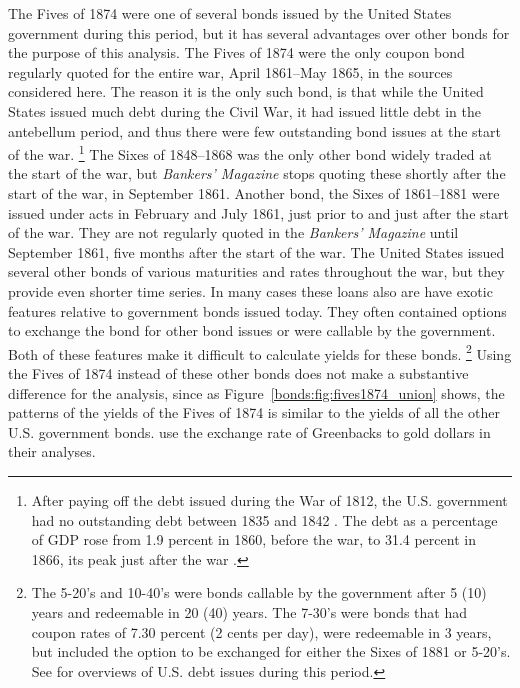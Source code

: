 The Fives of 1874 were one of several bonds issued by the United States government during this period, but it has several advantages over other bonds for the purpose of this analysis.
The Fives of 1874 were the only coupon bond regularly quoted for the entire war, April 1861--May 1865, in the sources considered here.
The reason it is the only such bond, is that while the United States issued much debt during the Civil War, it had issued little debt in the antebellum period, and thus there were few outstanding bond issues at the start of the war.%
\footnote{
  After paying off the debt issued during the War of 1812, the U.S. government had no outstanding debt between 1835 and 1842 \parencite[297]{HomerSylla2005}.
  The debt as a percentage of GDP rose from 1.9 percent in 1860, before the war, to 31.4 percent in 1866, its peak just after the war \parencites{CBO2012}{CBO2012a}.
}
The Sixes of 1848--1868 was the only other bond widely traded at the start of the war, but \textit{Bankers' Magazine} stops quoting these shortly after the start of the war,  in September 1861.
Another bond, the  Sixes of 1861--1881 were issued under acts in February and July 1861, just prior to and just after the start of the war.
They are not regularly quoted in the \textit{Bankers' Magazine} until September 1861, five months after the start of the war.
The United States issued several other bonds of various maturities and rates throughout the war, but they provide even shorter time series.
In many cases these loans also are have exotic features relative to government bonds issued today.
They often contained options to exchange the bond for other bond issues or were callable by the government. 
Both of these features make it difficult to calculate yields for these bonds.%
\footnote{
  The 5-20's and 10-40's were bonds callable by the government after 5 (10) years and redeemable in 20 (40) years.
  The 7-30's were bonds that had coupon rates of 7.30 percent (2 cents per day), were redeemable in 3 years, but included the option to be exchanged for either the Sixes of 1881 or 5-20's.
  See \textcites{Bayley1882}{DeKnight1900}[297--309]{HomerSylla2005} for overviews of U.S. debt issues during this period.
}
Using the Fives of 1874 instead of these other bonds does not make a substantive difference for the analysis, since as Figure~\ref{bonds:fig:fives1874_union} shows, the patterns of the yields  of the Fives of 1874 is similar to the yields of all the other U.S. government bonds.
\textcites{WillardGuinnaneEtAl1996}{McCandless1996}{SmithSmith1997} use the exchange rate of Greenbacks to gold dollars in their analyses.
